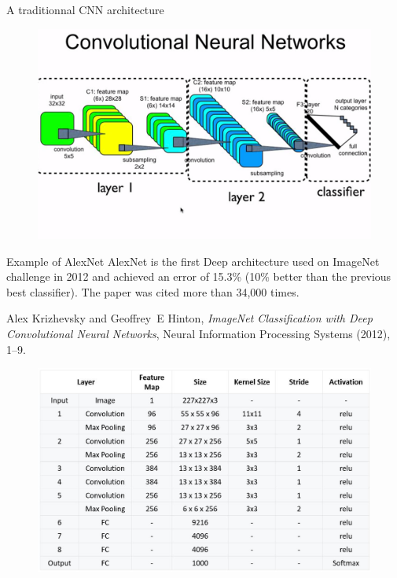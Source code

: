\documentclass[handout]{beamer}
\begin{document}
\begin{frame}[fragile]{A traditionnal CNN architecture}
    \begin{figure}
\centering
    \includegraphics[width=.8\textwidth,trim={0 0cm 0cm 3cm},clip]{fig/L2/CNN.png}
\end{figure}
\end{frame}

\begin{frame}{Example of AlexNet}
    \alert{AlexNet} is the first Deep architecture used on ImageNet challenge in 2012 and achieved an \alert{error of 15.3\%} (10\% better than the previous best classifier). The paper was cited more than 34,000 times.

\begin{thebibliography}{GBC16}

Alex Krizhevsky and Geoffrey~E Hinton, \emph{{ImageNet Classification with Deep
  Convolutional Neural Networks}}, Neural Information Processing Systems
  (2012), 1--9.

\end{thebibliography}
    \begin{figure}
        \centering
        \includegraphics[width=.5\textwidth]{fig/L2/AlexNet_Summary_Table.jpg}

    \end{figure}
\end{frame}
\end{document}
